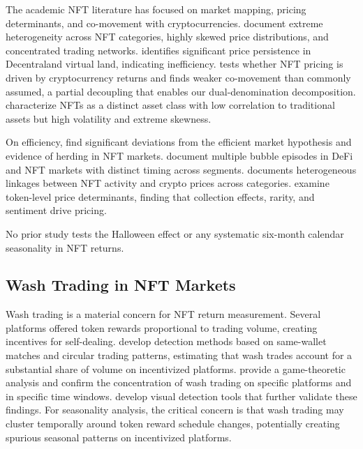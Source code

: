 \documentclass[12pt,a4paper]{article}
\begin{document}
The academic NFT literature has focused on market mapping, pricing determinants, and co-movement with cryptocurrencies. \citet{Nadini2021} document extreme heterogeneity across NFT categories, highly skewed price distributions, and concentrated trading networks. \citet{Dowling2022a} identifies significant price persistence in Decentraland virtual land, indicating inefficiency. \citet{Dowling2022b} tests whether NFT pricing is driven by cryptocurrency returns and finds weaker co-movement than commonly assumed, a partial decoupling that enables our dual-denomination decomposition. \citet{KongLin2021} characterize NFTs as a distinct asset class with low correlation to traditional assets but high volatility and extreme skewness.

On efficiency, \citet{OzdemirKumar2023} find significant deviations from the efficient market hypothesis and evidence of herding in NFT markets. \citet{MaouchiCharfeddine2022} document multiple bubble episodes in DeFi and NFT markets with distinct timing across segments. \citet{Ante2022} documents heterogeneous linkages between NFT activity and crypto prices across categories. \citet{HorkyRachelFidrmuc2022} examine token-level price determinants, finding that collection effects, rarity, and sentiment drive pricing.

No prior study tests the Halloween effect or any systematic six-month calendar seasonality in NFT returns.

\subsection{Wash Trading in NFT Markets}

Wash trading is a material concern for NFT return measurement. Several platforms offered token rewards proportional to trading volume, creating incentives for self-dealing. \citet{VonWachterJensenRegner2022} develop detection methods based on same-wallet matches and circular trading patterns, estimating that wash trades account for a substantial share of volume on incentivized platforms. \citet{LaMorgiaMeiMongardini2023} provide a game-theoretic analysis and confirm the concentration of wash trading on specific platforms and in specific time windows. \citet{WenWang2023} develop visual detection tools that further validate these findings. For seasonality analysis, the critical concern is that wash trading may cluster temporally around token reward schedule changes, potentially creating spurious seasonal patterns on incentivized platforms.
\end{document}
